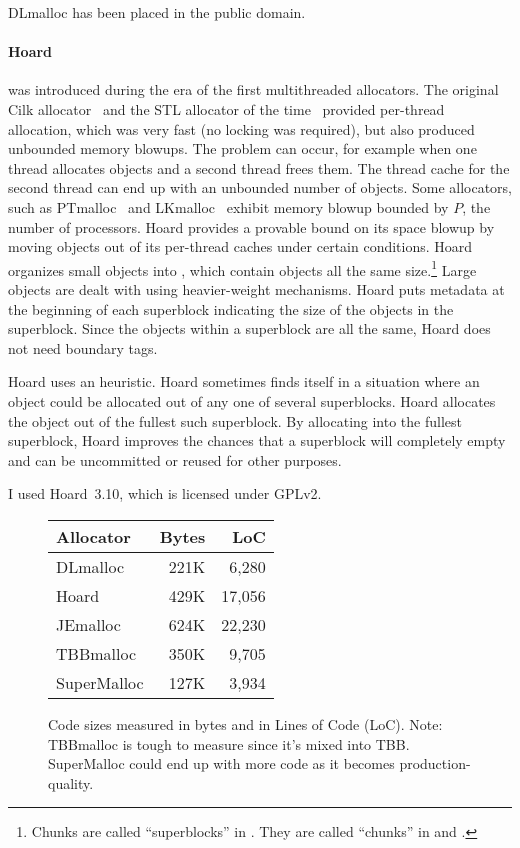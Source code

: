 \documentclass{sigplanconf}
\begin{document}
DLmalloc has been placed in the public domain.

{\paragraph{Hoard}} \cite{BergerMcBl00} was introduced during the era
of the first multithreaded allocators.  The original Cilk
allocator~\cite{BlumofeLe94} and the STL allocator of the
time~\cite{SGI97} provided per-thread allocation, which was very fast
(no locking was required), but also produced unbounded memory blowups.
The problem can occur, for example when one thread allocates objects
and a second thread frees them.  The thread cache for the second
thread can end up with an unbounded number of objects.  Some
allocators, such as PTmalloc~\cite{Gloger06} and
LKmalloc~\cite{LarsonKr98} exhibit memory blowup bounded by $P$, the
number of processors.  Hoard provides a provable bound on its space
blowup by moving objects out of its per-thread caches under certain
conditions.  Hoard organizes small objects into , which
contain objects all the same size.\footnote{Chunks are called
  ``superblocks'' in \cite{BergerMcBl00}.  They are called ``chunks''
  in \cite{Evans06} and \cite{KukanovVo07}.}  Large objects are dealt
with using heavier-weight mechanisms.  Hoard puts metadata at the
beginning of each superblock indicating the size of the objects in the
superblock.  Since the objects within a superblock are all the same,
Hoard does not need boundary tags.

Hoard uses an  heuristic.  Hoard sometimes
finds itself in a situation where an object could be allocated out of
any one of several superblocks.  Hoard allocates the object out of the
fullest such superblock. By allocating into the fullest superblock,
Hoard improves the chances that a superblock will completely empty and
can be uncommitted or reused for other purposes.

I used Hoard~3.10, which is licensed under GPLv2.

\begin{figure}
\begin{center}
\begin{tabular}{lrr}
Allocator & Bytes        & LoC \\ \hline
 DLmalloc    \cite{Lea96}        & 221K &  6,280 \\
 Hoard       \cite{BergerMcBl00} & 429K & 17,056 \\
 JEmalloc    \cite{Evans06}      & 624K & 22,230 \\
 TBBmalloc   \cite{KukanovVo07}  & 350K &  9,705 \\
 SuperMalloc                     & 127K &  3,934 \\
\end{tabular}
\end{center}
\caption{Code sizes measured in bytes and in Lines of Code (LoC).
  Note: TBBmalloc is tough to measure since it's mixed into TBB.
  SuperMalloc could end up with more code as it becomes
  production-quality.}
\label{fig:codesize}
\end{figure}
\end{document}
